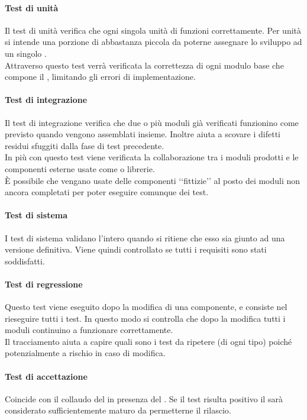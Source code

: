 			\paragraph{Test di unità}
				Il test di unità verifica che ogni singola unità di  funzioni correttamente. Per unità si intende una porzione di  abbastanza piccola da poterne assegnare lo sviluppo ad un singolo \PR. \\
				Attraverso questo test verrà verificata la correttezza di ogni modulo base che compone il , limitando gli errori di implementazione.
			\paragraph{Test di integrazione}
				Il test di integrazione verifica che due o più moduli già verificati funzionino come previsto quando vengono assemblati insieme. Inoltre aiuta a scovare i difetti residui sfuggiti dalla fase di test precedente. \\
				In più con questo test viene verificata la collaborazione tra i moduli prodotti e le componenti esterne usate come  o librerie. \\
				È possibile che vengano usate delle componenti ‘‘fittizie’’ al posto dei moduli non ancora completati per poter eseguire comunque dei test.
			\paragraph{Test di sistema}
				I test di sistema validano l'intero   quando si ritiene che esso sia giunto ad una versione definitiva. Viene quindi controllato se tutti i requisiti sono stati soddisfatti.
			\paragraph{Test di regressione}
				Questo test viene eseguito dopo la modifica di una componente, e consiste nel rieseguire tutti i test. In questo modo si controlla che dopo la modifica tutti i moduli continuino a funzionare correttamente. \\
				Il tracciamento aiuta a capire quali sono i test da ripetere (di ogni tipo) poiché potenzialmente a rischio in caso di modifica.
			\paragraph{Test di accettazione}
				Coincide con il collaudo del  in presenza del . Se il test risulta positivo il  sarà considerato sufficientemente maturo da permetterne il rilascio.
